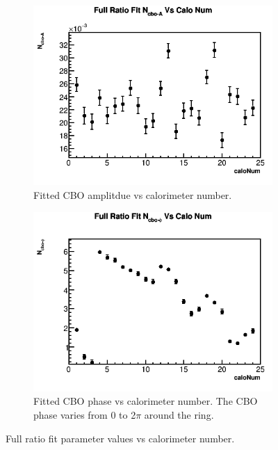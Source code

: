 \begin{figure}[H]
    \vspace{4mm}
    \begin{subfigure}[t]{0.4\textwidth}
	    \centering
		\includegraphics[width=\textwidth]{RatioCBOFit_N_cbo-A_Vs_Calo_Canv}
	    \caption{Fitted CBO amplitdue vs calorimeter number.}
    \end{subfigure}
    \hspace{4mm}
    \begin{subfigure}[t]{0.4\textwidth}
	    \centering
		\includegraphics[width=\textwidth]{RatioCBOFit_N_cbo-phi_Vs_Calo_Canv}
	    \caption{Fitted CBO phase vs calorimeter number. The CBO phase varies from 0 to 2$\pi$ around the ring.}
    \end{subfigure}%
\caption[PerCaloPlots]{Full ratio fit parameter values vs calorimeter number.}
\label{fig:PerCaloPlots}
\end{figure}


